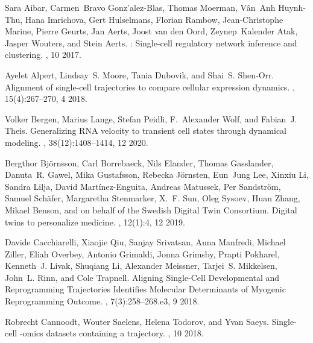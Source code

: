 \documentclass[10pt, a4paper]{article}
\begin{document}
\begin{thebibliography}{10}
	
	Sara Aibar, Carmen~Bravo Gonz{\a'a}lez-Blas, Thomas Moerman, V{\^a}n~Anh
	Huynh-Thu, Hana Imrichova, Gert Hulselmans, Florian Rambow, Jean-Christophe
	Marine, Pierre Geurts, Jan Aerts, Joost {van den Oord}, Zeynep~Kalender Atak,
	Jasper Wouters, and Stein Aerts.
	: Single-cell regulatory network inference and clustering.
	, 10 2017.
	
	Ayelet Alpert, Lindsay~S. Moore, Tania Dubovik, and Shai~S. Shen-Orr.
	\newblock Alignment of single-cell trajectories to compare cellular expression
	dynamics.
	, 15(4):267--270, 4 2018.
	
	Volker Bergen, Marius Lange, Stefan Peidli, F.~Alexander Wolf, and Fabian~J.
	Theis.
	\newblock Generalizing {{RNA}} velocity to transient cell states through
	dynamical modeling.
	, 38(12):1408--1414, 12 2020.
	
	Bergthor Bj{\"o}rnsson, Carl Borrebaeck, Nils Elander, Thomas Gasslander,
	Danuta~R. Gawel, Mika Gustafsson, Rebecka J{\"o}rnsten, Eun~Jung Lee, Xinxiu
	Li, Sandra Lilja, David Mart\'inez-Enguita, Andreas Matussek, Per
	Sandstr{\"o}m, Samuel Sch{\"a}fer, Margaretha Stenmarker, X.~F. Sun, Oleg
	Sysoev, Huan Zhang, Mikael Benson, and {on behalf of the Swedish Digital Twin
		Consortium}.
	\newblock Digital twins to personalize medicine.
	, 12(1):4, 12 2019.
	
	Davide Cacchiarelli, Xiaojie Qiu, Sanjay Srivatsan, Anna Manfredi, Michael
	Ziller, Eliah Overbey, Antonio Grimaldi, Jonna Grimsby, Prapti Pokharel,
	Kenneth~J. Livak, Shuqiang Li, Alexander Meissner, Tarjei~S. Mikkelsen,
	John~L. Rinn, and Cole Trapnell.
	\newblock Aligning {{Single}}-{{Cell Developmental}} and {{Reprogramming
			Trajectories Identifies Molecular Determinants}} of {{Myogenic Reprogramming
			Outcome}}.
	, 7(3):258--268.e3, 9 2018.
	
	Robrecht Cannoodt, Wouter Saelens, Helena Todorov, and Yvan Saeys.
	\newblock Single-cell -omics datasets containing a trajectory.
	, 10 2018.
	

\end{thebibliography}
\end{document}
